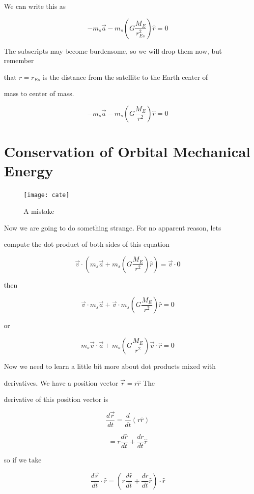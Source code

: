 We can write this as 

$$
-m_{s}\overrightarrow{a}-m_{s}\left( G\frac{M_{E}}{r_{Es}^{2}}\right) \hat{r}=0
$$


The subscripts may become burdensome, so we will drop them now, but remember

that $r=r_{Es}$ is the distance from the satellite to the Earth center of

mass to center of mass. 

$$-m_{s}\overrightarrow{a}-m_{s}\left( G\frac{M_{E}}{r^{2}}\right) \hat{r}=0$$


\section{Conservation of Orbital Mechanical Energy}

\begin{figure}[h]
	\begin{center}
		\texttt{[image: cate]}	
		\caption{A mistake}
	\end{center}
\end{figure}

Now we are going to do something strange. For no apparent reason, lets

compute the dot product of both sides of this equation 

$$\overrightarrow{v}\cdot \left( m_{s}\overrightarrow{a}+m_{s}\left( G\frac{M_{E}}{r^{2}}\right) \hat{r}\right) =\overrightarrow{v}\cdot 0 $$

then 

$$\overrightarrow{v}\cdot m_{s}\overrightarrow{a}+\overrightarrow{v}\cdot m_{s}\left( G\frac{M_{E}}{r^{2}}\right) \hat{r}=0 $$

or

$$m_{s}\overrightarrow{v}\cdot \overrightarrow{a}+m_{s}\left( G\frac{M_{E}}{r^{2}}\right) \overrightarrow{v}\cdot \hat{r}=0 $$

Now we need to learn a little bit more about dot products mixed with

derivatives. We have a position vector $\overrightarrow{r}=r\hat{r}$ The

derivative of this position vector is 

$$\frac{d\overrightarrow{r}}{dt}=\frac{d}{dt}\left( r\hat{r}\right) $$

$$=r\frac{d\hat{r}}{dt}+\frac{dr}{dt}\hat{r}$$


so if we take 

$$\frac{d\overrightarrow{r}}{dt}\cdot \hat{r}=\left( r\frac{d\hat{r}}{dt}+\frac{dr}{dt}\hat{r}\right) \cdot \hat{r}$$



